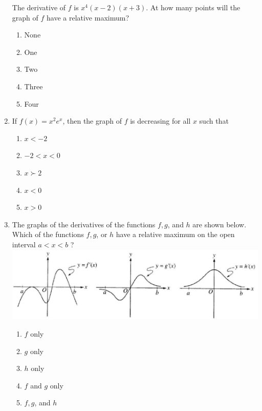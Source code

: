 \documentclass{article}
\begin{document}
\begin{enumerate}
\begin{minipage}[t]{\linewidth}
		The derivative of \(f\) is \(x^{4}(x-2)(x+3)\). At how many points will
the graph of \(f\) have a relative maximum?
\vspace{1em}
		\begin{enumerate}
		\itemsep1em
			\item None
			\item One
			\item Two
			\item Three
			\item Four
		\end{enumerate}
	\end{minipage}
	\item
	\begin{minipage}[t]{\linewidth}
		If \(f(x)=x^{2} e^{x}\), then the graph of \(f\) is decreasing for all
\(x\) such that
\vspace{1em}
		\begin{enumerate}
		\itemsep1em
			\item \(x<-2\)
			\item \(-2<x<0\)
			\item \(x \succ 2\)
			\item \(x<0\)
			\item \(x>0\)
		\end{enumerate}
	\end{minipage}
	\item
	\begin{minipage}[t]{\linewidth}
		The graphs of the derivatives of the functions \(f, g\), and \(h\) are
shown below. Which of the functions \(f, g\), or \(h\) have a relative
maximum on the open interval \(a<x<b\) ?\\
\includegraphics[width=5.013333333333334in]{media/f765d5c6-c7a8-54f4-bfaa-b2393cdce2e6.jpg}
\vspace{1em}
		\begin{enumerate}
		\itemsep1em
			\item \(f\) only
			\item \(g\) only
			\item \(h\) only
			\item \(f\) and \(g\) only
			\item \(f, g\), and \(h\)

\end{enumerate}
\end{minipage}
\end{enumerate}
\end{document}
